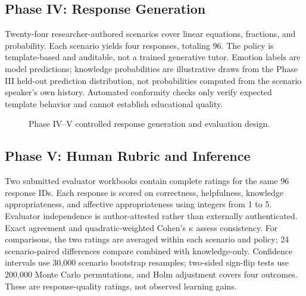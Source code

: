 \documentclass[conference]{IEEEtran}
\begin{document}
\subsection{Phase IV: Response Generation}
Twenty-four researcher-authored scenarios cover linear equations, fractions, and probability. Each scenario yields four responses, totaling 96. The policy is template-based and auditable, not a trained generative tutor. Emotion labels are model predictions; knowledge probabilities are illustrative draws from the Phase III held-out prediction distribution, not probabilities computed from the scenario speaker's own history. Automated conformity checks only verify expected template behavior and cannot establish educational quality.
\begin{figure}[t]\centering
\setlength{\fboxsep}{3pt}
\caption{Phase IV--V controlled response generation and evaluation design.}\label{fig:policy}\end{figure}
\subsection{Phase V: Human Rubric and Inference}
Two submitted evaluator workbooks contain complete ratings for the same 96 response IDs. Each response is scored on correctness, helpfulness, knowledge appropriateness, and affective appropriateness using integers from 1 to 5. Evaluator independence is author-attested rather than externally authenticated. Exact agreement and quadratic-weighted Cohen's $\kappa$ assess consistency. For comparisons, the two ratings are averaged within each scenario and policy; 24 scenario-paired differences compare combined with knowledge-only. Confidence intervals use 30,000 scenario bootstrap resamples; two-sided sign-flip tests use 200,000 Monte Carlo permutations, and Holm adjustment covers four outcomes. These are response-quality ratings, not observed learning gains.
\end{document}

